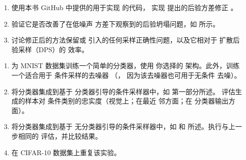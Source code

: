 \documentclass[../../book-main_zh.tex]{subfiles}
\begin{document}
\begin{exercise}

    \begin{enumerate}
        \item 使用本书 GitHub 中提供的用于实现
             的代码，
            实现
            提出的后验方差修正
            \textcite{rozet2024learning}。
        \item 验证它是否改善了在低噪声
            方差下观察到的后验坍塌问题，如
             所示。
        \item 讨论修正后的方法保留或
            引入的任何采样正确性问题，以及它相对于
            扩散后验采样（DPS）的
            效率。
    \end{enumerate}

\end{exercise}

\begin{exercise}
    \begin{enumerate}
        \item 为 MNIST 数据集训练一个简单的分类器，使用
            你选择的
            架构。此外，训练一个适合用于
            条件采样的去噪器
            （，
                因为该去噪器也可用于无条件
            去噪）。
        \item 将分类器集成到基于
            分类器引导的条件采样器中，如
             第一部分所述。
            评估生成的样本对
            条件类别的忠实度（视觉上；在最近
                邻方面；在
            分类器输出方面）。
        \item 将分类器集成到基于
            无分类器引导的条件采样器中，如  和
             所述。执行与上一步相同的
            评估，并比较结果。
        \item 在 CIFAR-10 数据集上重复该实验。
    \end{enumerate}

\end{exercise}
\end{document}

